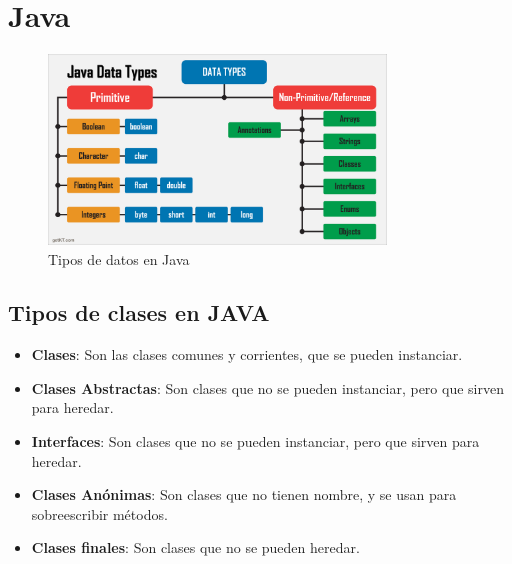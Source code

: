 \documentclass[../main.tex]{subfiles}
\begin{document}
\section{Java} 
    \begin{figure}[h]
        \centering
        \includegraphics[width=0.8\textwidth]{../images/tipos_datos.png}
        \caption{Tipos de datos en Java \cite{tipos_de_datos_primitivos}}
        \label{fig:java}
    \end{figure}

    \subsection{Tipos de clases en JAVA}
        \begin{itemize}
            \item \textbf{Clases}: Son las clases comunes y corrientes, que se pueden instanciar.
            \item \textbf{Clases Abstractas}: Son clases que no se pueden instanciar, pero que sirven para heredar.
            \item \textbf{Interfaces}: Son clases que no se pueden instanciar, pero que sirven para heredar.
            \item \textbf{Clases Anónimas}: Son clases que no tienen nombre, y se usan para sobreescribir métodos.
            \item \textbf{Clases finales}: Son clases que no se pueden heredar.
        \end{itemize}
\end{document}
